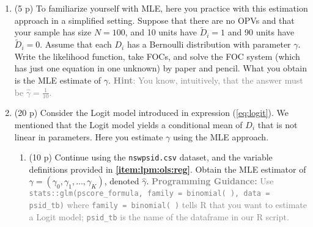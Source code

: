 \documentclass{article}
\begin{document}
\begin{enumerate}[label=\textbf{Q\arabic{enumi}}.,ref=Q\arabic{enumi}, wide=0pt, itemsep=0em, topsep=5pt, labelindent=0pt, resume]
\item (5 p) To familiarize yourself with MLE, here you practice with this estimation approach in a simplified setting. Suppose that there are no OPVs and that your sample has size $N=100$, and 10 units have $\tilde{D}_i=1$ and 90 units have $\tilde{D}_i=0$. Assume that each $D_i$ has a Bernoulli distribution with parameter $\gamma$. Write the likelihood function, take FOCs, and solve the FOC system (which has just one equation in one unknown) by paper and pencil. What you obtain is the MLE estimate of $\gamma$. \textcolor{gray}{\textbf{Hint}: You know, intuitively, that the answer must be $\hat{\gamma}=\frac{1}{10}$.}
\item (20 p) Consider the Logit model introduced in expression (\ref{eq:logit}). We mentioned that the Logit model yields a conditional mean of $D_i$ that is not linear in parameters. Here you estimate $\gamma$ using the MLE approach.\begin{enumerate}
\item (10 p) Continue using the \texttt{nswpsid.csv} dataset, and the variable definitions provided in \textbf{\ref{item:lpm:ols:reg}}. Obtain the MLE estimator of $\gamma= (\gamma_0,\gamma_1,\dots,\gamma_K)$, denoted $\hat{\gamma}$. \textcolor{gray}{\textbf{Programming Guidance:} Use \\ \texttt{stats::glm(pscore\_formula, family = binomial( ), data = psid\_tb)} where \texttt{family = binomial( )} tells R that you want to estimate a Logit model; \texttt{psid\_tb} is the name of the dataframe in our R script.}\label{item:logit:reg}


\end{enumerate}
\end{enumerate}
\end{document}
